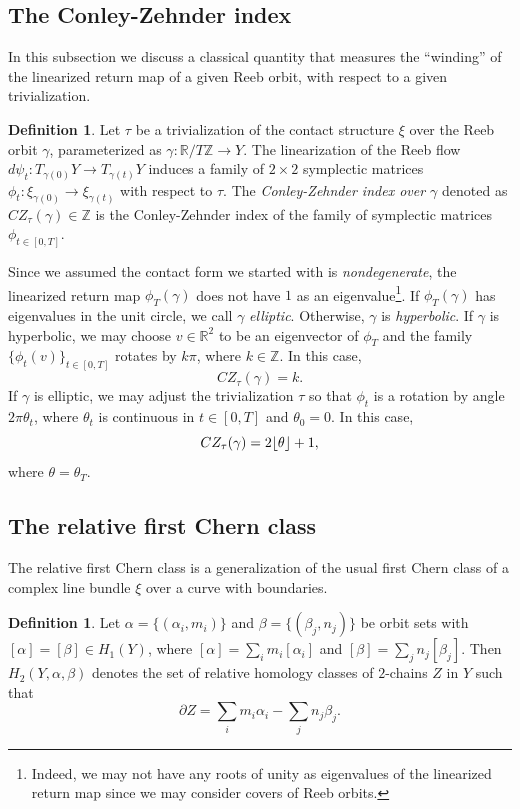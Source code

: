 \documentclass{article}
\numberwithin{equation}{section}
\theoremstyle{definition}
\newtheorem{definition}[theorem]{Definition}
\DeclarePairedDelimiter{\floor}{\lfloor}{\rfloor}
\begin{document}
\subsection{The Conley-Zehnder index}
\label{sec:CZ}
In this subsection we discuss a classical quantity that measures the ``winding'' of the linearized return map of a given Reeb orbit, with respect to a given trivialization.

\begin{definition}
    Let $\tau$ be a trivialization of the contact structure $\xi$ over the Reeb orbit $\gamma$, parameterized as $\gamma:\mathbb{R}/T\mathbb{Z} \to Y$. The linearization of the Reeb flow $d\psi_t:T_{\gamma(0)} Y \to T_{\gamma(t)}Y$ induces a family of $2\times 2$ symplectic matrices $\phi_t:\xi_{\gamma(0)} \to \xi_{\gamma(t)}$ with respect to $\tau$. The \emph{Conley-Zehnder index over $\gamma$} denoted as $CZ_\tau(\gamma)\in \mathbb{Z}$ is the Conley-Zehnder index of the family of symplectic matrices $\phi_{t\in [0,T]}$.
\end{definition}

Since we assumed the contact form we started with is \emph{nondegenerate}, the linearized return map $\phi_T(\gamma)$ does not have $1$ as an eigenvalue\footnote{Indeed, we may not have any roots of unity as eigenvalues of the linearized return map since we may consider covers of Reeb orbits.}. If $\phi_T(\gamma)$ has eigenvalues in the unit circle, we call $\gamma$ \emph{elliptic}. Otherwise, $\gamma$ is \emph{hyperbolic}. If $\gamma$ is hyperbolic, we may choose $v\in \mathbb{R}^2$ to be an eigenvector of $\phi_T$ and the family $\{\phi_t(v)\}_{t\in [0,T]}$ rotates by $k\pi$, where $k\in \mathbb{Z}$. In this case, 
$$CZ_\tau(\gamma) = k.$$ 
If $\gamma$ is elliptic, we may adjust the trivialization $\tau$ so that $\phi_t$ is a rotation by angle $2\pi \theta_t$, where $\theta_t$ is continuous in $t\in [0,T]$ and $\theta_0 =0$. In this case, $$CZ_\tau(\gamma) = 2\floor{\theta}+1,$$
where $\theta= \theta_T$.

\subsection{The relative first Chern class}
\label{sec:c1}
The relative first Chern class is a generalization of the usual first Chern class of a complex line bundle $\xi$ over a curve with boundaries. 
\begin{definition}
    Let $\alpha = \{(\alpha_i, m_i)\}$ and $\beta = \{(\beta_j, n_j)\}$ be orbit sets with $[\alpha] = [\beta]\in H_1(Y)$, where $[\alpha] = \sum_i m_i [\alpha_i]$ and $[\beta] = \sum_j n_j [\beta_j]$. Then $H_2(Y, \alpha, \beta)$ denotes the set of relative homology classes of $2$-chains $Z$ in $Y$ such that
    $$\partial Z = \sum_i m_i\alpha_i - \sum_j n_j \beta_j.$$
\end{definition}
\end{document}
